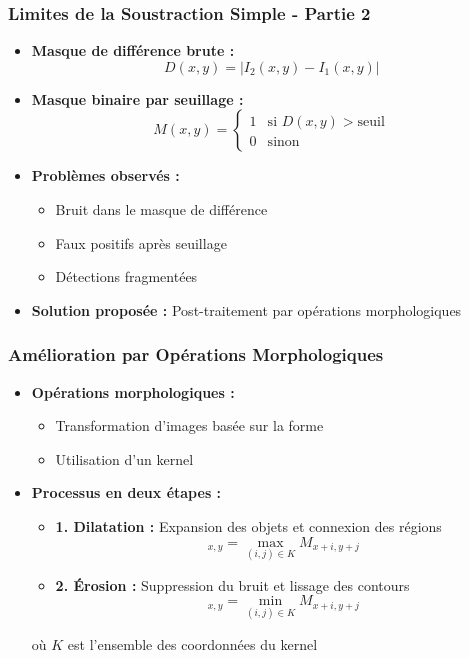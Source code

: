 \documentclass{beamer}
\begin{document}
\begin{frame}
    \frametitle{Limites de la Soustraction Simple - Partie 2}
    \begin{itemize}
        \item \textbf{Masque de différence brute :}
        \begin{equation*}
            D(x,y) = |I_2(x,y) - I_1(x,y)|
        \end{equation*}
        \item \textbf{Masque binaire par seuillage :}
        \begin{equation*}
            M(x,y) = \begin{cases}
                1 & \text{si } D(x,y) > \text{seuil} \\
                0 & \text{sinon}
            \end{cases}
        \end{equation*}
        \item \textbf{Problèmes observés :}
        \begin{itemize}
            \item Bruit dans le masque de différence
            \item Faux positifs après seuillage
            \item Détections fragmentées
        \end{itemize}
        \item \textbf{Solution proposée :} Post-traitement par opérations morphologiques
    \end{itemize}
\end{frame}

\begin{frame}
    \frametitle{Amélioration par Opérations Morphologiques}
    \begin{itemize}
        \item \textbf{Opérations morphologiques :}
        \begin{itemize}
            \item Transformation d'images basée sur la forme
            \item Utilisation d'un kernel
        \end{itemize}
        \item \textbf{Processus en deux étapes :}
        \begin{itemize}
            \item \textbf{1. Dilatation :} Expansion des objets et connexion des régions
            \begin{equation*}
                [D(M)]_{x,y} = \max_{(i,j) \in K} M_{x+i,y+j}
            \end{equation*}
            \item \textbf{2. Érosion :} Suppression du bruit et lissage des contours
            \begin{equation*}
                [E(M)]_{x,y} = \min_{(i,j) \in K} M_{x+i,y+j}
            \end{equation*}
        \end{itemize}
        où \(K\) est l'ensemble des coordonnées du kernel
    \end{itemize}
\end{frame}
\end{document}
